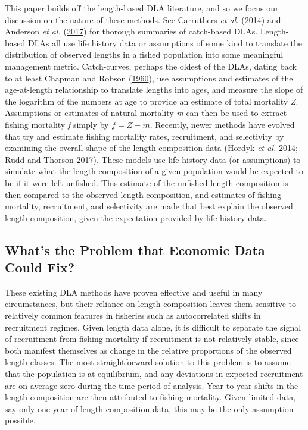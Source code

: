\documentclass[twoside,12pt,final]{ucthesis-CA2012}
\begin{document}
\begin{ucmainmatter}
This paper builds off the length-based DLA literature, and so we focus
our discussion on the nature of these methods. See Carruthers \emph{et
al.} (\protect\hyperlink{ref-Carruthers2014}{2014}) and Anderson
\emph{et al.} (\protect\hyperlink{ref-Anderson2017b}{2017}) for thorough
summaries of catch-based DLAs. Length-based DLAs all use life history
data or assumptions of some kind to translate the distribution of
observed lengths in a fished population into some meaningful management
metric. Catch-curves, perhaps the oldest of the DLAs, dating back to at
least Chapman and Robson (\protect\hyperlink{ref-Chapman1960}{1960}),
use assumptions and estimates of the age-at-length relationship to
translate lengths into ages, and measure the slope of the logarithm of
the numbers at age to provide an estimate of total mortality \emph{Z}.
Assumptions or estimates of natural mortality \emph{m} can then be used
to extract fishing mortality \emph{f} simply by \(f = Z - m\). Recently,
newer methods have evolved that try and estimate fishing mortality
rates, recruitment, and selectivity by examining the overall shape of
the length composition data (Hordyk \emph{et al.}
\protect\hyperlink{ref-Hordyk2014}{2014}; Rudd and Thorson
\protect\hyperlink{ref-Rudd2017}{2017}). These models use life history
data (or assumptions) to simulate what the length composition of a given
population would be expected to be if it were left unfished. This
estimate of the unfished length composition is then compared to the
observed length composition, and estimates of fishing mortality,
recruitment, and selectivity are made that best explain the observed
length composition, given the expectation provided by life history data.

\subsection{What's the Problem that Economic Data Could
Fix?}\label{whats-the-problem-that-economic-data-could-fix}

These existing DLA methods have proven effective and useful in many
circumstances, but their reliance on length composition leaves them
sensitive to relatively common features in fisheries such as
autocorrelated shifts in recruitment regimes. Given length data alone,
it is difficult to separate the signal of recruitment from fishing
mortality if recruitment is not relatively stable, since both manifest
themselves as change in the relative proportions of the observed length
classes. The most straightforward solution to this problem is to assume
that the population is at equilibrium, and any deviations in expected
recruitment are on average zero during the time period of analysis.
Year-to-year shifts in the length composition are then attributed to
fishing mortality. Given limited data, say only one year of length
composition data, this may be the only assumption possible.


\end{ucmainmatter}
\end{document}
